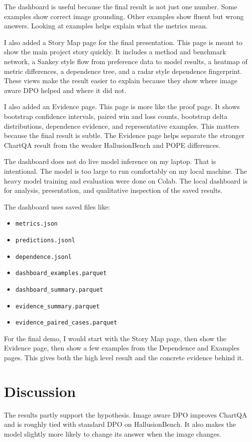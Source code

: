 \documentclass{article}
\begin{document}
The dashboard is useful because the final result is not just one number.
Some examples show correct image grounding.
Other examples show fluent but wrong answers.
Looking at examples helps explain what the metrics mean.

I also added a Story Map page for the final presentation.
This page is meant to show the main project story quickly.
It includes a method and benchmark network, a Sankey style flow from preference data to model results, a heatmap of metric differences, a dependence tree, and a radar style dependence fingerprint.
These views make the result easier to explain because they show where image aware DPO helped and where it did not.

I also added an Evidence page.
This page is more like the proof page.
It shows bootstrap confidence intervals, paired win and loss counts, bootstrap delta distributions, dependence evidence, and representative examples.
This matters because the final result is subtle.
The Evidence page helps separate the stronger ChartQA result from the weaker HallusionBench and POPE differences.

The dashboard does not do live model inference on my laptop.
That is intentional.
The model is too large to run comfortably on my local machine.
The heavy model training and evaluation were done on Colab.
The local dashboard is for analysis, presentation, and qualitative inspection of the saved results.

The dashboard uses saved files like:

\begin{itemize}
    \item \texttt{metrics.json}
    \item \texttt{predictions.jsonl}
    \item \texttt{dependence.jsonl}
    \item \texttt{dashboard\_examples.parquet}
    \item \texttt{dashboard\_summary.parquet}
    \item \texttt{evidence\_summary.parquet}
    \item \texttt{evidence\_paired\_cases.parquet}
\end{itemize}

For the final demo, I would start with the Story Map page, then show the Evidence page, then show a few examples from the Dependence and Examples pages.
This gives both the high level result and the concrete evidence behind it.

\section{Discussion}
The results partly support the hypothesis.
Image aware DPO improves ChartQA and is roughly tied with standard DPO on HallusionBench.
It also makes the model slightly more likely to change its answer when the image changes.
\end{document}
